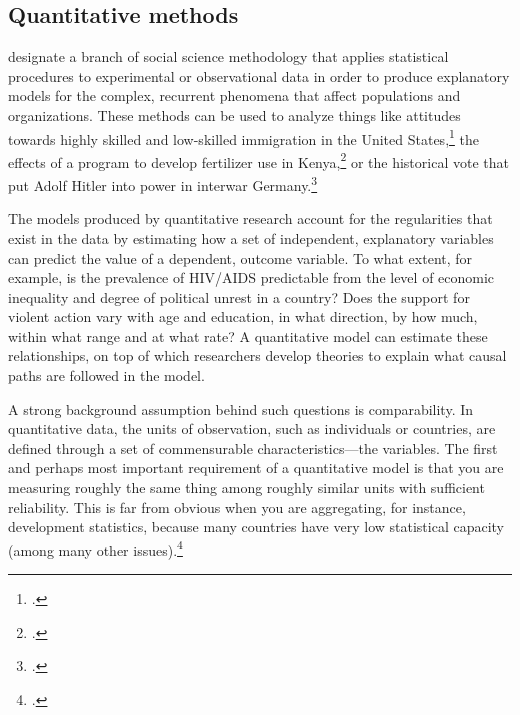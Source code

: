	
	
	\subsection{Quantitative methods}%
		\label{sec:quantitative-methods}

	 designate a branch of social science methodology that applies statistical procedures to experimental or observational data in order to produce explanatory models for the complex, recurrent phenomena that affect populations and organizations. These methods can be used to analyze things like attitudes towards highly skilled and low-skilled immigration in the United States,\footcite{HainmuellerHiscox:2010a} the effects of a program to develop fertilizer use in Kenya,\footcite{DufloKremer:2009a} or the historical vote that put Adolf Hitler into power in interwar Germany.\footcite{KingRosen:2008a}%

	The models produced by quantitative research account for the regularities that exist in the data by estimating how a set of independent, explanatory variables can predict the value of a dependent, outcome variable. To what extent, for example, is the prevalence of HIV/AIDS predictable from the level of economic inequality and degree of political unrest in a country? Does the support for violent action vary with age and education, in what direction, by how much, within what range and at what rate? A quantitative model can estimate these relationships, on top of which researchers develop theories to explain what causal paths are followed in the model.%

	A strong background assumption behind such questions is comparability. In quantitative data, the units of observation, such as individuals or countries, are defined through a set of commensurable characteristics—the variables. The first and perhaps most important requirement of a quantitative model is that you are measuring roughly the same thing among roughly similar units with sufficient reliability. This is far from obvious when you are aggregating, for instance, development statistics, because many countries have very low statistical capacity (among many other issues).\footcite{Jerven:2013a}%

